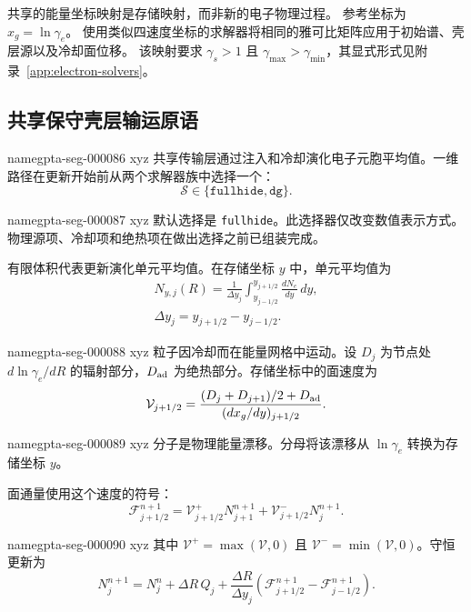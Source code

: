 \documentclass[twocolumn]{aastex702}
\makeatletter
\providecommand{\gptareaderanchor}[1]{\pdfdest name{#1} xyz}%
\providecommand{\gptareaderanchor}[1]{\special{pdf:dest (#1) [ @thispage /XYZ @xpos @ypos null ]}}%
\makeatother
\begin{document}
共享的能量坐标映射是存储映射，而非新的电子物理过程。
参考坐标为 \(x_g=\ln\gamma_e\)。
使用类似四速度坐标的求解器将相同的雅可比矩阵应用于初始谱、壳层源以及冷却面位移。
该映射要求 \(\gamma_s>1\) 且 \(\gamma_{\max}>\gamma_{\min}\)，其显式形式见附录~\ref{app:electron-solvers}。

\subsection{共享保守壳层输运原语}


\gptareaderanchor{gpta-seg-000086}%
共享传输层通过注入和冷却演化电子元胞平均值。一维路径在更新开始前从两个求解器族中选择一个：
\begin{equation}
\mathcal{S}\in\{\texttt{fullhide},\texttt{dg}\}.
\end{equation}

\gptareaderanchor{gpta-seg-000087}%
默认选择是 \texttt{fullhide}。此选择器仅改变数值表示方式。物理源项、冷却项和绝热项在做出选择之前已组装完成。

有限体积代表更新演化单元平均值。在存储坐标 \(y\) 中，单元平均值为
\begin{equation}
\begin{aligned}
N_{y,j}(R)=\frac{1}{\Delta y_j}
\int_{y_{j-1/2}}^{y_{j+1/2}}\frac{dN_e}{dy}\,dy ,
\\
\Delta y_j=y_{j+1/2}-y_{j-1/2}.
\end{aligned}
\end{equation}

\gptareaderanchor{gpta-seg-000088}%
粒子因冷却而在能量网格中运动。设 \(D_j\) 为节点处 \(d\ln\gamma_e/dR\) 的辐射部分，\(D_{\rm ad}\) 为绝热部分。存储坐标中的面速度为
\begin{equation}
\mathcal{V}_{j+1/2}=
\frac{(D_j+D_{j+1})/2+D_{\rm ad}}
{(dx_g/dy)_{j+1/2}} .
\end{equation}

\gptareaderanchor{gpta-seg-000089}%
分子是物理能量漂移。分母将该漂移从 \(\ln\gamma_e\) 转换为存储坐标 \(y\)。

面通量使用这个速度的符号：
\begin{equation}
\mathcal{F}_{j+1/2}^{n+1}
=\mathcal{V}_{j+1/2}^{+}N_{j+1}^{n+1}
+\mathcal{V}_{j+1/2}^{-}N_j^{n+1}.
\end{equation}

\gptareaderanchor{gpta-seg-000090}%
其中 \(\mathcal{V}^{+}=\max(\mathcal{V},0)\) 且 \(\mathcal{V}^{-}=\min(\mathcal{V},0)\)。守恒更新为
\begin{equation}
N_j^{n+1}=N_j^n+\Delta R\,Q_j
+\frac{\Delta R}{\Delta y_j}
\left(\mathcal{F}_{j+1/2}^{n+1}
-\mathcal{F}_{j-1/2}^{n+1}\right).
\end{equation}
\end{document}
